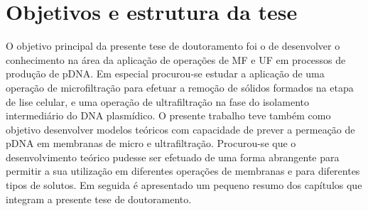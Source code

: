 \section{Objetivos e estrutura da tese}
O objetivo principal da presente tese de doutoramento foi o de desenvolver o conhecimento na área da aplicação de operações de MF e UF em processos de produção de pDNA. Em especial procurou-se estudar a aplicação de uma operação de microfiltração para efetuar a remoção de sólidos formados na etapa de lise celular, e uma operação de ultrafiltração na fase do isolamento intermediário do DNA plasmídico. O presente trabalho teve também como objetivo desenvolver modelos teóricos com capacidade de prever a permeação de pDNA em membranas de micro e ultrafiltração. Procurou-se que o desenvolvimento teórico pudesse ser efetuado de uma forma abrangente para permitir a sua utilização em diferentes operações de membranas e para diferentes tipos de solutos. Em seguida é apresentado um pequeno resumo dos capítulos que integram a presente tese de doutoramento. 
